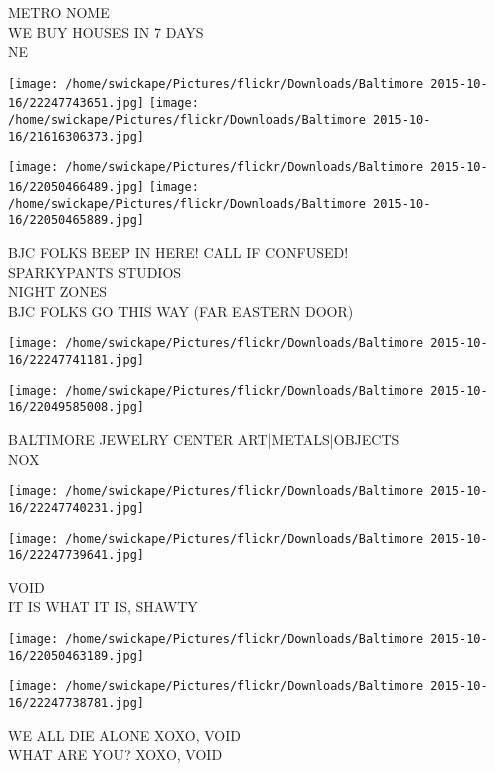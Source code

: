 \documentclass[10pt,letterpaper]{article}
\begin{document}
METRO NOME\\
WE BUY HOUSES IN 7 DAYS\\
NE\\
\pagebreak

\texttt{[image: /home/swickape/Pictures/flickr/Downloads/Baltimore 2015-10-16/22247743651.jpg]}
\texttt{[image: /home/swickape/Pictures/flickr/Downloads/Baltimore 2015-10-16/21616306373.jpg]}

\texttt{[image: /home/swickape/Pictures/flickr/Downloads/Baltimore 2015-10-16/22050466489.jpg]}
\texttt{[image: /home/swickape/Pictures/flickr/Downloads/Baltimore 2015-10-16/22050465889.jpg]}

BJC FOLKS BEEP IN HERE! CALL IF CONFUSED!\\
SPARKYPANTS STUDIOS\\
NIGHT ZONES\\
BJC FOLKS GO THIS WAY (FAR EASTERN DOOR)\\
\pagebreak

\texttt{[image: /home/swickape/Pictures/flickr/Downloads/Baltimore 2015-10-16/22247741181.jpg]}

\vspace{0.25in}
\texttt{[image: /home/swickape/Pictures/flickr/Downloads/Baltimore 2015-10-16/22049585008.jpg]}

BALTIMORE JEWELRY CENTER ART|METALS|OBJECTS\\
NOX\\
\pagebreak

\texttt{[image: /home/swickape/Pictures/flickr/Downloads/Baltimore 2015-10-16/22247740231.jpg]}

\vspace{0.25in}
\texttt{[image: /home/swickape/Pictures/flickr/Downloads/Baltimore 2015-10-16/22247739641.jpg]}

VOID\\
IT IS WHAT IT IS, SHAWTY\\
\pagebreak

\texttt{[image: /home/swickape/Pictures/flickr/Downloads/Baltimore 2015-10-16/22050463189.jpg]}

\vspace{0.25in}
\texttt{[image: /home/swickape/Pictures/flickr/Downloads/Baltimore 2015-10-16/22247738781.jpg]}

WE ALL DIE ALONE XOXO, VOID\\
WHAT ARE YOU?  XOXO, VOID\\
\pagebreak
\end{document}
